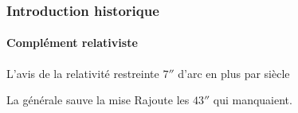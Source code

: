 \begin{frame}
	\frametitle{Introduction historique}
	\framesubtitle{Complément relativiste}

	\begin{block}{L'avis de la relativité restreinte}
		$7''$ d'arc
		en plus par siècle
	\end{block}

	\pause

	\begin{exampleblock}{La générale sauve la mise}
		Rajoute
		les $43''$ qui manquaient.
	\end{exampleblock}

\end{frame}
